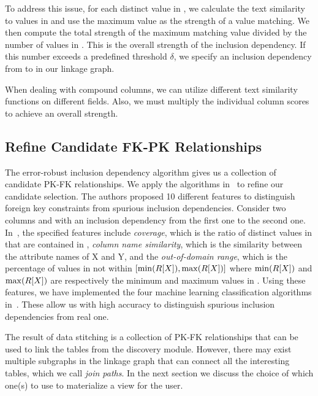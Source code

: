 To address this issue, for each distinct value in \RX, we calculate the text similarity to values in \SY and use the maximum value as the strength of a value matching. We then compute the total strength of the maximum matching value divided by the number of values in \RX. This is the overall strength of the inclusion dependency.  If this number exceeds a predefined threshold $\delta$, we specify an inclusion dependency from \RX to \SY in our linkage graph.

When dealing with compound columns, we can utilize different text similarity functions on different fields. Also, we must multiply the individual column scores to achieve an overall strength.


\subsection{Refine Candidate FK-PK Relationships}\label{subsec:refine}


The error-robust inclusion dependency algorithm gives us a collection of candidate PK-FK relationships.
We apply the algorithms in~\cite{DBLP:conf/webdb/RostinABNL09} to refine our candidate selection. The authors proposed 10 different features to distinguish foreign key constraints from spurious inclusion dependencies. Consider two columns \RX and \SY with an inclusion dependency from the first one to the second one. In~\cite{DBLP:conf/webdb/RostinABNL09}, the specified features include \emph{coverage}, which is the ratio of distinct values in \RX that are contained in \SY, \emph{column name similarity}, which is the similarity between the attribute names of X and Y, and the \emph{out-of-domain range}, which is the percentage of values in \SY not within $[\min(R[X]), \max(R[X])]$ where $\min(R[X])$ and $\max(R[X])$ are respectively the minimum and maximum values in \RX.
Using these features, we have implemented the four machine learning classification algorithms in~\cite{DBLP:conf/webdb/RostinABNL09}. These allow us with high accuracy to distinguish spurious inclusion dependencies from real one.

The result of data stitching is a collection of PK-FK relationships that can be used to link the tables from the discovery module. However, there may exist multiple subgraphs in the linkage graph that can connect all the interesting tables, which we call \emph{join paths}. In the next section we discuss the choice of which one(s) to use to materialize a view for the user.


